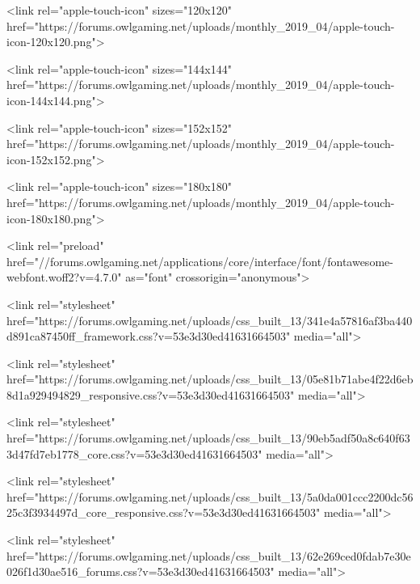 		
	

	
		
			
				<link rel="apple-touch-icon" sizes="120x120" href="https://forums.owlgaming.net/uploads/monthly_2019_04/apple-touch-icon-120x120.png">
			
		
	

	
		
			
				<link rel="apple-touch-icon" sizes="144x144" href="https://forums.owlgaming.net/uploads/monthly_2019_04/apple-touch-icon-144x144.png">
			
		
	

	
		
			
				<link rel="apple-touch-icon" sizes="152x152" href="https://forums.owlgaming.net/uploads/monthly_2019_04/apple-touch-icon-152x152.png">
			
		
	

	
		
			
				<link rel="apple-touch-icon" sizes="180x180" href="https://forums.owlgaming.net/uploads/monthly_2019_04/apple-touch-icon-180x180.png">
			
		
	





<link rel="preload" href="//forums.owlgaming.net/applications/core/interface/font/fontawesome-webfont.woff2?v=4.7.0" as="font" crossorigin="anonymous">
		




	<link rel="stylesheet" href="https://forums.owlgaming.net/uploads/css_built_13/341e4a57816af3ba440d891ca87450ff_framework.css?v=53e3d30ed41631664503" media="all">

	<link rel="stylesheet" href="https://forums.owlgaming.net/uploads/css_built_13/05e81b71abe4f22d6eb8d1a929494829_responsive.css?v=53e3d30ed41631664503" media="all">

	<link rel="stylesheet" href="https://forums.owlgaming.net/uploads/css_built_13/90eb5adf50a8c640f633d47fd7eb1778_core.css?v=53e3d30ed41631664503" media="all">

	<link rel="stylesheet" href="https://forums.owlgaming.net/uploads/css_built_13/5a0da001ccc2200dc5625c3f3934497d_core_responsive.css?v=53e3d30ed41631664503" media="all">

	<link rel="stylesheet" href="https://forums.owlgaming.net/uploads/css_built_13/62e269ced0fdab7e30e026f1d30ae516_forums.css?v=53e3d30ed41631664503" media="all">

